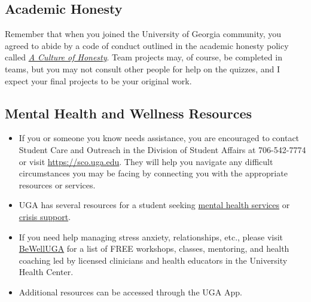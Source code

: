 \documentclass[11pt, letterpaper]{article}
\begin{document}




\subsection*{Academic Honesty}
Remember that when you joined the University of Georgia community, you agreed to abide by a code of conduct outlined in the academic honesty policy called \href{https://honesty.uga.edu/Academic-Honesty-Policy/Introduction/}{\textit{A Culture of Honesty}}. Team projects may, of course, be completed in teams, but you may not consult other people for help on the quizzes, and I expect your final projects to be your original work.

\subsection*{Mental Health and Wellness Resources}

\begin{itemize}
\item If you or someone you know needs assistance, you are encouraged to contact Student Care and Outreach in the Division of Student Affairs at 706-542-7774 or visit \href{https://sco.uga.edu}{https://sco.uga.edu}. They will help you navigate any difficult circumstances you may be facing by connecting you with the appropriate resources or services. 
\item UGA has several resources for a student seeking \href{https://www.uhs.uga.edu/bewelluga/bewelluga}{mental health services} or \href{https://www.uhs.uga.edu/info/emergencies}{crisis support}. 
\item If you need help managing stress anxiety, relationships, etc., please visit \href{https://www.uhs.uga.edu/bewelluga/bewelluga}{BeWellUGA} for a list of FREE workshops, classes, mentoring, and health coaching led by licensed clinicians and health educators in the University Health Center.
\item Additional resources can be accessed through the UGA App.
\end{itemize}



\end{document}

